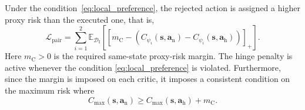 \documentclass[9pt,journal]{IEEEtran}
\newcommand{\CPCal}{\ensuremath{\mathrm{CPCal}}}
\newcommand{\DI}{\mathcal{D}_{\mathrm{I}}}
\newcommand{\E}{\mathbb{E}}
\newcommand{\va}{\bm{a}}
\newcommand{\vs}{\bm{s}}
\newcommand{\vah}{\ensuremath{\va_{\mathrm h}}}      %
\newcommand{\van}{\ensuremath{\va_{\mathrm n}}}      %
\begin{document}

Under the condition~\eqref{eq:local_preference},
the rejected action is assigned a higher proxy risk than
the executed one, that is,
\begin{equation}
    \mathcal L_{\mathrm{pair}}
    =
    \sum_{i=1}^{2}
    \E_{\DI}
    \left[
    \left[
    m_{\mathrm C}
    -
    \left(
    C_{\psi_i}\!\left(\vs,\van\right)
    -
    C_{\psi_i}\!\left(\vs,\vah\right)
    \right)
    \right]_+
    \right].
    \label{eq:pairloss}
\end{equation}
Here $m_{\mathrm C}>0$ is the required same-state
proxy-risk margin. The hinge penalty is active whenever
the condition \eqref{eq:local_preference} is violated.
Furthermore, since the margin is imposed on each critic,
it imposes a consistent condition on the maximum risk where
\begin{equation}
    C_{\max}(\vs,\van)
    \geq
    C_{\max}(\vs,\vah)+m_{\mathrm C}.
    \label{eq:extremum_pair_order}
\end{equation}
\end{document}
